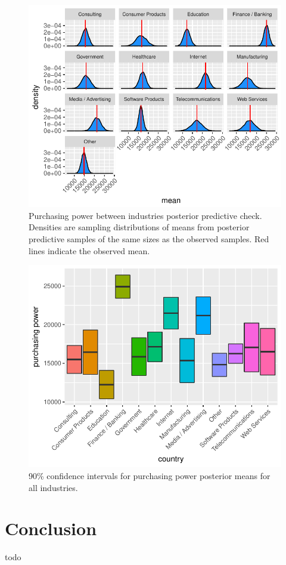 \documentclass{article}
\begin{document}
\begin{figure}[H]
\centering
\includegraphics{report-044}
\caption{Purchasing power between industries posterior predictive check. Densities are sampling distributions of means from posterior predictive samples of the same sizes as the observed samples. Red lines indicate the observed mean.}\label{fig_13}
\end{figure}


\begin{figure}[H]
\centering
\includegraphics{report-046}
\caption{90\% confidence intervals for purchasing power posterior means for all industries.}\label{fig_14}
\end{figure}

\section{Conclusion}
todo
\end{document}
